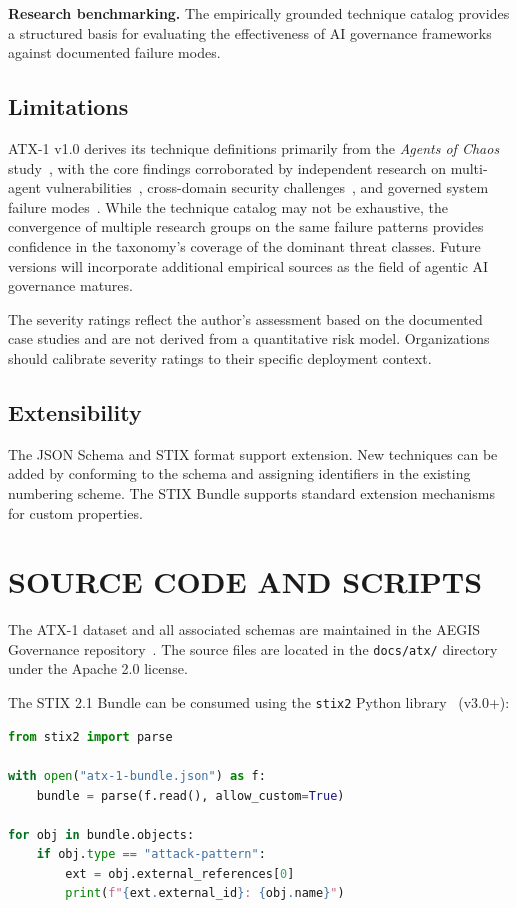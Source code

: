 \documentclass{IEEEoj-data}
\begin{document}
{\bf Research benchmarking.} The empirically grounded technique catalog provides a structured basis for evaluating the effectiveness of AI governance frameworks against documented failure modes.

\subsection*{Limitations}

ATX-1 v1.0 derives its technique definitions primarily from the {\it Agents of Chaos} study~\cite{ref4}, with the core findings corroborated by independent research on multi-agent vulnerabilities~\cite{ref11}, cross-domain security challenges~\cite{ref12}, and governed system failure modes~\cite{ref13}. While the technique catalog may not be exhaustive, the convergence of multiple research groups on the same failure patterns provides confidence in the taxonomy's coverage of the dominant threat classes. Future versions will incorporate additional empirical sources as the field of agentic AI governance matures.

The severity ratings reflect the author's assessment based on the documented case studies and are not derived from a quantitative risk model. Organizations should calibrate severity ratings to their specific deployment context.

\subsection*{Extensibility}

The JSON Schema and STIX format support extension. New techniques can be added by conforming to the schema and assigning identifiers in the existing numbering scheme. The STIX Bundle supports standard extension mechanisms for custom properties.


\section*{SOURCE CODE AND SCRIPTS}

The ATX-1 dataset and all associated schemas are maintained in the AEGIS Governance repository~\cite{ref14}. The source files are located in the \texttt{docs/atx/} directory under the Apache 2.0 license.

The STIX 2.1 Bundle can be consumed using the \texttt{stix2} Python library~\cite{ref15} (v3.0+):

\begin{lstlisting}[language=Python]
from stix2 import parse

with open("atx-1-bundle.json") as f:
    bundle = parse(f.read(), allow_custom=True)

for obj in bundle.objects:
    if obj.type == "attack-pattern":
        ext = obj.external_references[0]
        print(f"{ext.external_id}: {obj.name}")
\end{lstlisting}
\end{document}
